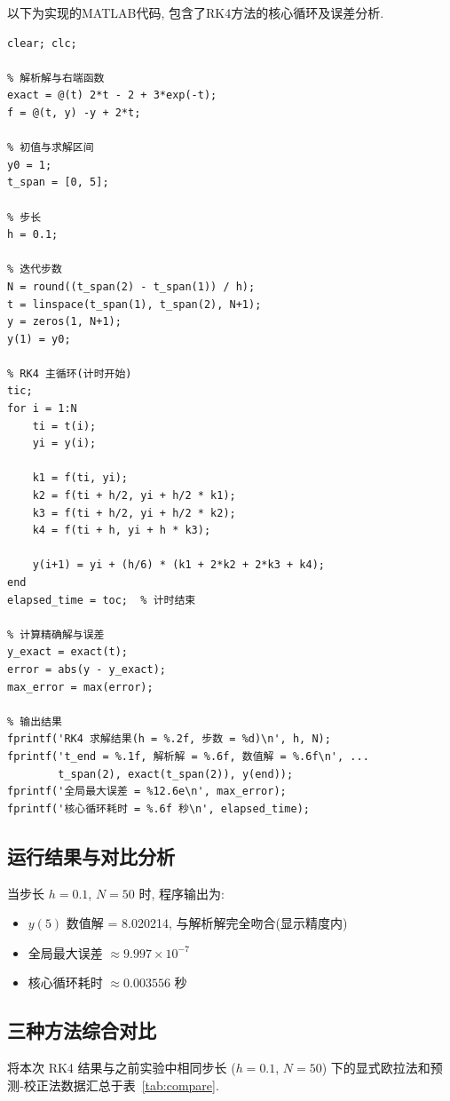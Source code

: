 \documentclass[12pt,a4paper]{ctexart}
\begin{document}
以下为实现的MATLAB代码, 包含了RK4方法的核心循环及误差分析.
\begin{lstlisting}[caption={四阶龙格-库塔法(RK4)求解程序}]
% 四阶龙格-库塔法(RK4)求解 y' = -y + 2t, y(0)=1, t∈[0,5]
clear; clc;

% 解析解与右端函数
exact = @(t) 2*t - 2 + 3*exp(-t);
f = @(t, y) -y + 2*t;

% 初值与求解区间
y0 = 1;
t_span = [0, 5];

% 步长
h = 0.1;

% 迭代步数
N = round((t_span(2) - t_span(1)) / h);
t = linspace(t_span(1), t_span(2), N+1);
y = zeros(1, N+1);
y(1) = y0;

% RK4 主循环(计时开始)
tic;
for i = 1:N
    ti = t(i);
    yi = y(i);
    
    k1 = f(ti, yi);
    k2 = f(ti + h/2, yi + h/2 * k1);
    k3 = f(ti + h/2, yi + h/2 * k2);
    k4 = f(ti + h, yi + h * k3);
    
    y(i+1) = yi + (h/6) * (k1 + 2*k2 + 2*k3 + k4);
end
elapsed_time = toc;  % 计时结束

% 计算精确解与误差
y_exact = exact(t);
error = abs(y - y_exact);
max_error = max(error);

% 输出结果
fprintf('RK4 求解结果(h = %.2f, 步数 = %d)\n', h, N);
fprintf('t_end = %.1f, 解析解 = %.6f, 数值解 = %.6f\n', ...
        t_span(2), exact(t_span(2)), y(end));
fprintf('全局最大误差 = %12.6e\n', max_error);
fprintf('核心循环耗时 = %.6f 秒\n', elapsed_time);
\end{lstlisting}

\subsection{运行结果与对比分析}
当步长 $h=0.1$, $N=50$ 时, 程序输出为: 
\begin{itemize}
    \item $y(5)$ 数值解 = 8.020214, 与解析解完全吻合(显示精度内)
    \item 全局最大误差 $\approx 9.997\times10^{-7}$
    \item 核心循环耗时 $\approx 0.003556$ 秒
\end{itemize}

\subsection{三种方法综合对比}
将本次 RK4 结果与之前实验中相同步长 ($h=0.1$, $N=50$) 下的显式欧拉法和预测‑校正法数据汇总于表~\ref{tab:compare}. 
\end{document}
